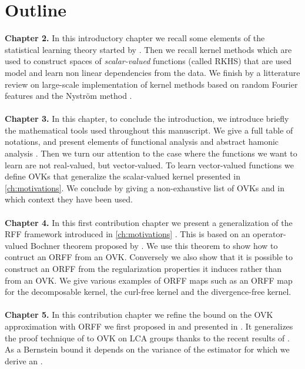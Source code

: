\section{Outline}
\textbf{Chapter 2.}
In this introductory chapter we recall some elements of the statistical
learning theory started by \citet{Vapnik1998}. Then we recall kernel methods
\citep{Aronszajn1950} which are used to construct spaces of
\emph{scalar-valued} functions (called \acs{RKHS}) that are used model and
learn non linear dependencies from the data. We finish by a litterature review
on large-scale implementation of kernel methods based on random Fourier
features \citep{Rahimi2007} and the Nystr\"om method
\citep{Williams2000-nystrom}.
\paragraph{}
\textbf{Chapter 3.}
In this chapter, to conclude the introduction, we introduce briefly the
mathematical tools used throughout this manuscript. We give a full table of
notations, and present elements of functional analysis
\citep{kurdila2006convex} and abstract hamonic analysis
\citep{folland1994course}. Then we turn our attention to the case where the
functions we want to learn are not real-valued, but vector-valued.  To learn
vector-valued functions we define \aclp{OVK} \citep{Micchelli2005, Carmeli2010}
that generalize the scalar-valued kernel presented in \cref{ch:motivations}. We
conclude by giving a non-exhaustive list of \aclp{OVK} and in which context
they have been used.

\paragraph{}
\textbf{Chapter 4.}
In this first contribution chapter we present a generalization of the \acs{RFF}
framework introduced in \cref{ch:motivations} \citep{brault2016random}. This is
based on an operator-valued Bochner theorem proposed by \citet{Carmeli2010}. We
use this theorem to show how to contruct an \acf{ORFF} from an \acs{OVK}.
Conversely we also show that it is possible to construct an \acs{ORFF} from the
regularization properties it induces rather than from an \acs{OVK}. We give
various examples of \acs{ORFF} maps such as an \acs{ORFF} map for the
decomposable kernel, the curl-free kernel and the divergence-free kernel.

\paragraph{}
\textbf{Chapter 5.} 
In this contribution chapter we refine the bound on the \ac{OVK} approximation
with \ac{ORFF} we first proposed in \cite{brault2016random} and presented in
\cite{braultborne}. It generalizes the proof technique of \citet{Rahimi2007} to
\ac{OVK} on \ac{LCA} groups thanks to the recent results of
\citet{sutherland2015, tropp2015introduction, minsker2011some,
koltchinskii2013remark}. As a Bernstein bound it depends on the variance of the
estimator for which we derive an .

